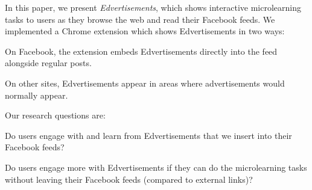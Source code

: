 \documentclass{sigchi}
\begin{document}

In this paper, we present \textit{Edvertisements}, which shows interactive microlearning tasks to users as they browse the web and read their Facebook feeds. We implemented a Chrome extension which shows Edvertisements in two ways:


\begin{compactitem}
\item On Facebook, the extension embeds Edvertisements directly into the feed alongside regular posts.
\item On other sites, Edvertisements appear in areas where advertisements would normally appear.
\end{compactitem}

\pagebreak

Our research questions are:

\begin{compactitem}
\item Do users engage with and learn from Edvertisements that we insert into their Facebook feeds?
\item Do users engage more with Edvertisements if they can do the microlearning tasks without leaving their Facebook feeds (compared to external links)?
\end{compactitem}
\end{document}
